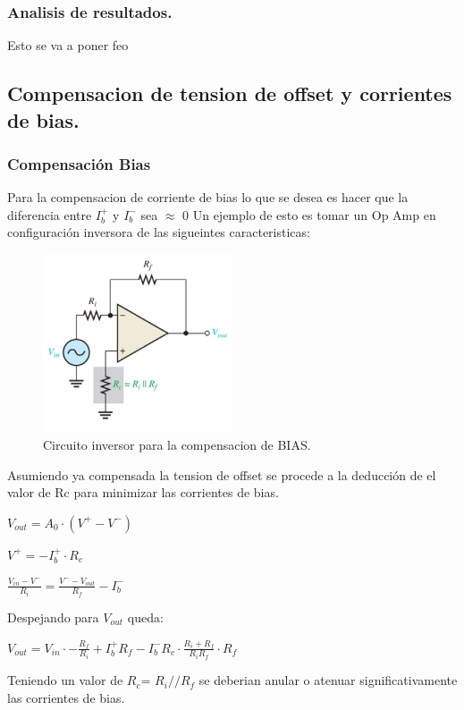 \subsubsection{Analisis de resultados.}
Esto se va a poner feo
\subsection{Compensacion de tension de offset y corrientes de bias.}
\subsubsection{Compensación Bias}
Para la compensacion de corriente de bias lo que se desea es hacer que la diferencia entre $I_b^+$ y $I_b^-$ sea $\approx$ 0
Un ejemplo de esto es tomar un Op Amp en configuración inversora  de las sigueintes caracteristicas:
\begin{figure}[H]	
	\centering
	\includegraphics[width=0.5\textwidth]{Ejercicio3/imagenes/CompensacionBias.PNG}
	\caption{Circuito inversor para la compensacion de BIAS.}
	\label{fig:CompensacionBias}
\end{figure}
Asumiendo ya compensada la tension de offset se procede a la deducción de el valor de Rc para minimizar las corrientes de bias.
\begin{center}$V_{out}=A_0 \cdot (V^+ - V^-)$\\\end{center}
\begin{center}$V^+=-I_b^+ \cdot R_c$\\\end{center}
\begin{center}$\frac{V_{in}-V^-}{R_i}=\frac{V^- - V_{out}}{R_f} -I_b^-$\\\end{center}
Despejando para $V_{out}$ queda:
\begin{center}$V_{out}=V_{in}\cdot -\frac{R_f}{R_i}+I_b^+ R_f-I_b^- R_c \cdot \frac{R_i+R_f}{R_i R_f}\cdot R_f $\\\end{center}
Teniendo un valor de $R_c$= $R_i//R_f$ se deberian anular o atenuar significativamente las corrientes de bias.
